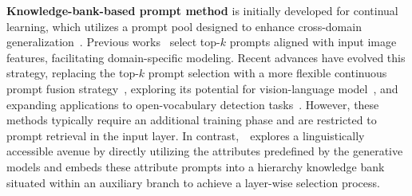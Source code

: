 \textbf{Knowledge-bank-based prompt method} is initially developed for continual learning, which utilizes a prompt pool designed to enhance cross-domain generalization~\citep{2022L2P, wang2022dualprompt, 2023codaprompt, 2023attriclip, du2022learning}. 
Previous works~\citep{2022L2P, wang2022dualprompt} select top-$k$ prompts aligned with input image features, facilitating domain-specific modeling.
Recent advances have evolved this strategy, replacing the top-$k$ prompt selection
with a more flexible continuous prompt fusion strategy~\citep{2023codaprompt}, exploring its potential for vision-language model~\citep{2023attriclip}, and expanding applications to open-vocabulary detection tasks~\citep{du2022learning}.
{However, these methods typically require an additional training phase and are restricted to prompt retrieval in the input layer. In contrast,~\ours~explores a linguistically accessible avenue by directly utilizing the attributes predefined by the generative models and embeds these attribute prompts into a hierarchy knowledge bank situated within an auxiliary branch to achieve a layer-wise selection process.
}